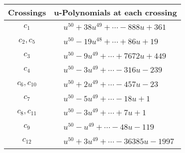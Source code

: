 \documentclass[1p]{elsarticle_modified}
\theoremstyle{definition}
\begin{document}
\begin{tabular}{m{50pt}|m{274pt}}
Crossings & \hspace{64pt}u-Polynomials at each crossing \\
\hline $$\begin{aligned}c_{1}\end{aligned}$$&$\begin{aligned}
&u^{50}+38 u^{49}+\cdots-888 u+361
\end{aligned}$\\
\hline $$\begin{aligned}c_{2},c_{5}\end{aligned}$$&$\begin{aligned}
&u^{50}-19 u^{48}+\cdots+86 u+19
\end{aligned}$\\
\hline $$\begin{aligned}c_{3}\end{aligned}$$&$\begin{aligned}
&u^{50}-9 u^{49}+\cdots+7672 u+449
\end{aligned}$\\
\hline $$\begin{aligned}c_{4}\end{aligned}$$&$\begin{aligned}
&u^{50}-3 u^{49}+\cdots-316 u-239
\end{aligned}$\\
\hline $$\begin{aligned}c_{6},c_{10}\end{aligned}$$&$\begin{aligned}
&u^{50}+2 u^{49}+\cdots-457 u-23
\end{aligned}$\\
\hline $$\begin{aligned}c_{7}\end{aligned}$$&$\begin{aligned}
&u^{50}-5 u^{49}+\cdots-18 u+1
\end{aligned}$\\
\hline $$\begin{aligned}c_{8},c_{11}\end{aligned}$$&$\begin{aligned}
&u^{50}-3 u^{49}+\cdots+7 u+1
\end{aligned}$\\
\hline $$\begin{aligned}c_{9}\end{aligned}$$&$\begin{aligned}
&u^{50}- u^{49}+\cdots-48 u-119
\end{aligned}$\\
\hline $$\begin{aligned}c_{12}\end{aligned}$$&$\begin{aligned}
&u^{50}+3 u^{49}+\cdots-36385 u-1997
\end{aligned}$\\
\hline
\end{tabular}\\~\\
\end{document}
